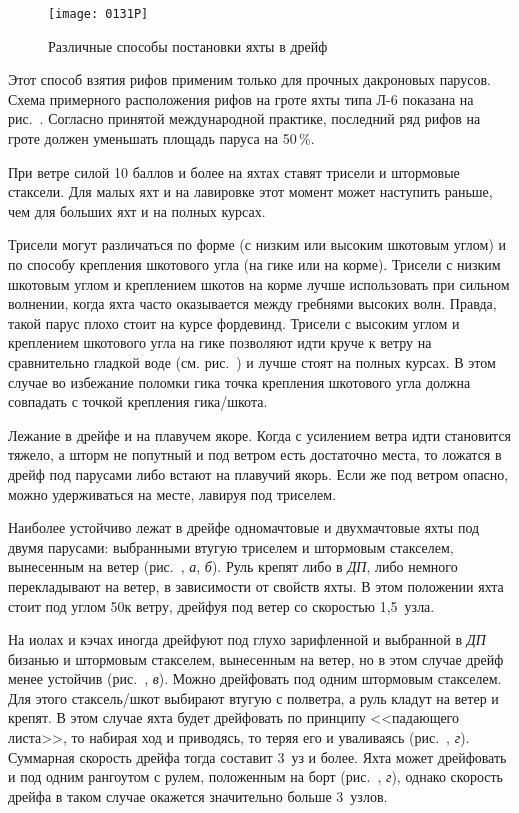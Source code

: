 \begin{figure*}[htb]
  \centering{}
  \texttt{[image: 0131P]}
  \caption{Различные способы постановки яхты в дрейф}
  \label{fig:131}
\end{figure*}

Этот способ взятия рифов применим только для прочных дакроновых парусов. Схема примерного расположения рифов на гроте яхты типа Л-6 показана на рис.~. Согласно принятой международной практике, последний ряд рифов на гроте должен уменьшать площадь паруса на 50\,\%. 

При ветре силой 10 баллов и более на яхтах ставят трисели и штормовые стаксели. Для малых яхт и на лавировке этот момент может наступить раньше, чем для больших яхт и на полных курсах. 

Трисели могут различаться по форме (с низким или высоким шкотовым углом) и по способу крепления шкотового угла (на гике или на корме). Трисели с низким шкотовым углом и креплением шкотов на корме лучше использовать при сильном волнении, когда яхта часто оказывается между гребнями высоких волн. Правда, такой парус плохо стоит на курсе фордевинд. Трисели с высоким углом и креплением шкотового угла на гике позволяют идти круче к ветру на сравнительно гладкой воде (см. рис.~) и лучше стоят на полных курсах. В этом случае во избежание поломки гика точка крепления шкотового угла должна совпадать с точкой крепления гика\-/шкота.

Лежание в дрейфе и на плавучем якоре. Когда с усилением ветра идти становится тяжело, а шторм не попутный и под ветром есть достаточно места, то ложатся в дрейф под парусами либо встают на плавучий якорь. Если же под ветром опасно, можно удерживаться на месте, лавируя под триселем.

Наиболее устойчиво лежат в дрейфе одномачтовые и двухмачтовые яхты под двумя парусами: выбранными втугую триселем и штормовым стакселем, вынесенным на ветер (рис.~, \textit{а}, \textit{б}). Руль крепят либо в \textit{ДП}, либо немного перекладывают на ветер, в зависимости от свойств яхты. В этом положении яхта стоит под углом 50\gr к ветру, дрейфуя под ветер со скоростью 1,5~узла. 

На иолах и кэчах иногда дрейфуют под глухо зарифленной и выбранной в \textit{ДП} бизанью и штормовым стакселем, вынесенным на ветер, но в этом случае дрейф менее устойчив (рис.~, \textit{в}). Можно дрейфовать под одним штормовым стакселем. Для этого стаксель\-/шкот выбирают втугую с полветра, а руль кладут на ветер и крепят. В этом случае яхта будет дрейфовать по принципу <<падающего листа>>, то набирая ход и приводясь, то теряя его и уваливаясь (рис.~, \textit{г}). Суммарная скорость дрейфа тогда составит 3~уз и более. Яхта может дрейфовать и под одним рангоутом с рулем, положенным на борт (рис.~, \textit{г}), однако скорость дрейфа в таком случае окажется значительно больше 3~узлов.

